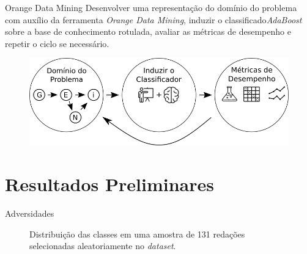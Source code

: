 \documentclass[10pt]{beamer}
\begin{document}
  \begin{frame}[fragile]{Orange Data Mining}
   Desenvolver uma representação do domínio do problema com auxílio da ferramenta \textit{Orange Data Mining}, induzir o classificado\textit{AdaBoost} sobre a base de conhecimento rotulada, avaliar as métricas de desempenho e repetir o ciclo se necessário.
  \begin{figure}[H]
  \begin{center}
      \includegraphics[scale=0.50]{images/methodology_2.png}
  \end{center}
  \end{figure}
  \end{frame}

\section{Resultados Preliminares}
  \begin{frame}[fragile]{Adversidades}
    \mydata

    \begin{figure}[H]
    \begin{center}
    \caption{Distribuição das classes em uma amostra de 131 redações selecionadas aleatoriamente no \textit{dataset}.}
    \label{gra:class_unbundling}
    \end{center}
    \end{figure}
  \end{frame}
\end{document}
